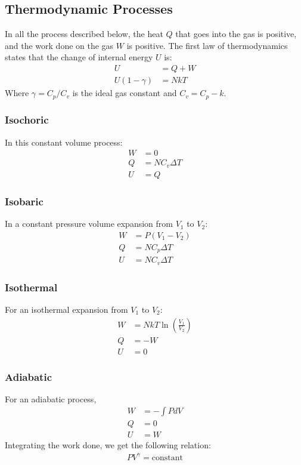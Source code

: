 \documentclass[11pt]{article}
\begin{document}
\begin{multicols*}{3}
\subsection{Thermodynamic Processes}
In all the process described below, the heat $Q$ that goes into the gas is positive, and the work done on the gas $W$ is positive. The first law of thermodynamics states that the change of internal energy $U$ is:
\begin{align*}
  U &= Q + W \\
  U (1- \gamma)  &= NkT
\end{align*}
Where $\gamma = C_p/C_v$ is the ideal gas constant and $C_v = C_p - k$.
\subsubsection{Isochoric}
In this constant volume process:
\begin{align*}
  W &= 0 \\
  Q &= N C_v \Delta T \\
  U &= Q
\end{align*}

\subsubsection{Isobaric}
In a constant pressure volume expansion from $V_1$ to $V_2$:
\begin{align*}
  W &= P(V_1 - V_2) \\
  Q &= N C_p \Delta T \\
  U &= N C_v \Delta T
\end{align*}

\subsubsection{Isothermal}
For an isothermal expansion from $V_1$ to $V_2$:
\begin{align*}
  W &= NkT \ln \left( \frac{V_1}{V_2} \right) \\
  Q &= - W \\
  U &= 0 
\end{align*}

\subsubsection{Adiabatic}
For an adiabatic process,
\begin{align*}
  W &= - \int P dV \\
  Q &= 0 \\
  U &= W
\end{align*}
Integrating the work done, we get the following relation:
\begin{align*}
  PV^{\gamma} = \text{constant}
\end{align*}


\end{multicols*}
\end{document}
